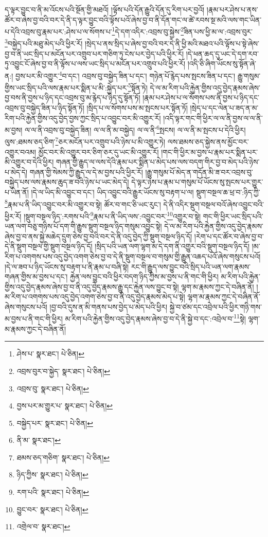 ད་ལྟར་བྱུང་བ་ནི་མ་འོངས་པའི་སྔོན་གྱི་མཐའོ། །ལྟོས་པའི་དོན་རྒྱུའི་དོན་དུ་རིག་པར་བྱའོ། །རྣམ་པར་ཤེས་པ་ནས་ཚོར་བ་ཞེས་བྱ་བའི་བར་དེ་ནི་ད་ལྟར་བྱུང་བའི་ལྟོས་པའོ་ཞེས་བྱ་བ་ནི་དོན་གང་ལ་ཚེ་རབས་སྔ་མའི་ལས་གང་ཡིན་པ་དེའི་འབྲས་བུ་རྣམ་པར་:ཤེས་པ་ལ་སོགས་པ་\footnote{ཤེས་པ་  སྣར་ཐང་།  པེ་ཅིན། }དེ་དག་འདིར་:འབྲས་བུ་སྐྱེས་\footnote{འབྲས་བུར་བ་སྐྱེད་  སྣར་ཐང་།  པེ་ཅིན། }ཟིན་པས་ཕྱི་མ་ལ་:འབྲས་བུར་\footnote{འབྲས་བུ་  སྣར་ཐང་།  པེ་ཅིན། }བསྐྱེད་པའི་མཐུ་མེད་པའི་ཕྱིར་རོ། །སྲེད་པ་ནས་སྲིད་པ་ཞེས་བྱ་བའི་བར་དེ་ནི་ཕྱི་མའི་མཐའ་པའི་ལྟོས་པ་སྟེ་ཞེས་བྱ་བ་ནི་ཡང་སྲིད་པ་མངོན་པར་འགྲུབ་པར་གཅིག་ཏུ་ངེས་པར་བྱེད་པའི་ཕྱིར་རོ། །དེ་ཕན་ཆད་དུ་ཡང་དེ་དག་རབ་ཏུ་འབྱུང་ངོ་ཞེས་བྱ་བ་ནི་ལྟོས་པ་ལས་ཡང་སྲིད་པ་མངོན་པར་འགྲུབ་པའི་ཕྱིར་རོ། །འདི་ཅི་ཞིག་ཡོངས་སུ་སྟོན་ཞེ་ན:། བྱས་པར་མི་འགྱུར་\footnote{བྱས་པར་མ་གྱུར་པ་  སྣར་ཐང་།  པེ་ཅིན། }བ་དང་། འབྲས་བུ་བསྐྱེད་ཟིན་པ་དང་། གཉེན་པོ་རྙེད་པས་སྤངས་ཟིན་པ་དང་། རྒྱུ་གསུམ་གྱིས་ཡང་སྲིད་པའི་ལས་རྣམ་པར་སྨིན་པ་མི་:སྐྱེད་པར་\footnote{བསྐྱེད་པར་  སྣར་ཐང་།  པེ་ཅིན། }སྟོན་ཏེ། དེ་ལ་མ་རིག་པའི་རྐྱེན་གྱིས་འདུ་བྱེད་རྣམས་ཞེས་བྱ་བས་ནི་བྱས་པ་ཉིད་དང་འབྲས་བུ་མ་རྙེད་པ་ཉིད་དུ་སྟོན་ཏོ། །རྣམ་པར་ཤེས་པ་ལ་སོགས་པས་ནི་བྱས་པ་ཉིད་དང་འབྲས་བུ་བསྐྱེད་ཟིན་པ་ཉིད་སྟོན་ཏོ། །སྲིད་པ་ལ་སོགས་པས་མ་སྤངས་པར་སྟོན་ཏོ། །སྲེད་པ་དང་ལེན་པ་ཟད་ན་མ་རིག་པའི་རྐྱེན་གྱིས་འདུ་བྱེད་བྱས་ཀྱང་སྲིད་པ་འབྱུང་བར་མི་འགྱུར་རོ། །འདི་ལྟར་གང་གི་ཕྱིར་ལ་ལ་ནི་བྱས་ལ་ལ་ནི་མ་བྱས། ལ་ལ་ནི་འབྲས་བུ་བསྐྱེད་ཟིན། ལ་ལ་ནི་མ་བསྐྱེད། ལ་ལ་ནི་\footnote{ནི་མ་  སྣར་ཐང་། }སྤངས། ལ་ལ་ནི་མ་སྤངས་པ་དེའི་ཕྱིར། ལུས་:ཐམས་ཅད་ཅིག་\footnote{ཐམས་ཅད་གཅིག་  སྣར་ཐང་།  པེ་ཅིན། }ཅར་མངོན་པར་འགྲུབ་པའི་ཉེས་པ་མི་འགྱུར་ཏེ། ལས་ཐམས་ཅད་སྐྱེས་ནས་མྱོང་བར་འགྱུར་བའམ། མྱོང་བར་མི་འགྱུར་བར་ཅིག་ཅར་དུ་ཡང་མི་འགྱུར་རོ། །གང་གི་ཕྱིར་མ་བྱས་པ་རྣམ་པར་སྨིན་པར་མི་འགྱུར་བ་དེའི་ཕྱིར། གཞན་གྱི་རྒྱུད་ལ་ལས་དེའི་རྣམ་པར་སྨིན་པ་མེད་པས་ལས་བདག་གིར་བྱ་བ་མེད་པའི་ཉེས་པ་མེད་དེ། གཞན་གྱི་སེམས་ཀྱི་རྒྱུད་ལ་དེ་མ་བྱས་པའི་ཕྱིར་རོ། །རྒྱུ་གསུམ་པོ་མེད་ན་གདོན་མི་ཟ་བར་འབྲས་བུ་བསྐྱེད་པས་ལས་རྣམས་ཆུད་ཟ་བའི་ཉེས་པ་ཡང་མེད་དེ། དེ་ལྟར་ཉེས་པ་རྣམ་པ་གསུམ་པོ་ཡོངས་སུ་སྤངས་པར་གྱུར་པ་ཡིན་ནོ། །དེ་ལ་ཡིད་མི་འབྱུང་བ་དང་། ཡིད་འབྱུང་བའི་རྒྱུར་ཡོངས་སུ་བརྟག་པ་ལ། སྡུག་བསྔལ་ཆ་ཕྲ་བ་:ཉིད་ཀྱི་\footnote{ཉིད་ཀྱིས་  སྣར་ཐང་།  པེ་ཅིན། }རྣམ་པ་ནི་ཡིད་འབྱུང་བར་མི་འགྱུར་བ་སྟེ། ཚོར་བ་གང་ཅི་ཡང་རུང་། དེ་ནི་འདིར་སྡུག་བསྔལ་བའོ་ཞེས་འབྱུང་བའི་ཕྱིར་རོ། །སྡུག་བསྔལ་ཉིད་:རགས་པའི་\footnote{རག་པའི་  སྣར་ཐང་།  པེ་ཅིན། }རྣམ་པ་ནི་ཡིད་ལས་:འབྱུང་བར་\footnote{བྱུང་བར་  སྣར་ཐང་།  པེ་ཅིན། }འགྱུར་བ་སྟེ། གང་གི་ཕྱིར་ཡང་སྲིད་པའི་ཡན་ལག་བཅུ་གཉིས་པོ་དག་གི་རྒྱུས་སྡུག་བསྔལ་ཉིད་གསུམ་འབྱུང་སྟེ། དེ་ལ་མ་རིག་པའི་རྐྱེན་གྱིས་འདུ་བྱེད་རྣམས་ཞེས་བྱ་བ་ནས་སྐྱེ་མཆེད་དྲུག་ཅེས་བྱ་བའི་བར་དེ་ནི་འདུ་བྱེད་ཀྱི་སྡུག་བསྔལ་ཉིད་དོ། །རེག་པ་དང་ཚོར་བ་ཞེས་བྱ་བ་དེ་ནི་སྡུག་བསྔལ་གྱི་སྡུག་བསྔལ་ཉིད་དོ། །སྲིད་པའི་ཡན་ལག་ལྷག་མ་དེ་དག་ནི་འགྱུར་བའི་སྡུག་བསྔལ་ཉིད་དོ། །མ་རིག་པ་འགགས་པས་འདུ་བྱེད་འགག་ཅེས་བྱ་བ་དེ་ནི་སྡུག་བསྔལ་བ་གསུམ་གྱི་རྒྱུན་འཆད་པའོ་ཞེས་གསུངས་པའོ། །དེ་ལ་ཟབ་པ་ཉིད་ཡོངས་སུ་བརྟག་པ་ནི་རྣམ་པ་བཞི་སྟེ། རང་གི་རྒྱུད་ལས་བྱུང་བའི་སྲིད་པའི་ཡན་ལག་རྣམས་གཞན་གྱིས་མ་བྱས་པ་དང་། རྐྱེན་ལས་བྱུང་བའི་ཕྱིར་བདག་ཉིད་ཀྱིས་མ་བྱས་པ་ནི་གང་གི་ཕྱིར། མ་རིག་པའི་རྐྱེན་གྱིས་འདུ་བྱེད་རྣམས་ཞེས་བྱ་བ་ནི་འདུ་བྱེད་རྣམས་རྒྱུ་དང་རྐྱེན་ལས་བྱུང་བ་སྟེ། ལྷག་མ་རྣམས་ཀྱང་དེ་བཞིན་ནོ། །མ་རིག་པ་འགགས་པས་འདུ་བྱེད་འགག་ཅེས་བྱ་བ་ནི་འདུ་བྱེད་རྣམས་མེད་པ་སྟེ། ལྷག་མ་རྣམས་ཀྱང་དེ་བཞིན་ནོ་ཞེས་གསུངས་པའོ། །བྱ་བའི་དུས་ན་མི་གནས་པས་བྱེད་པ་མེད་པའི་ཕྱིར། སྐྱེ་བ་ཙམ་དང་འབྲེལ་པའི་ཕྱིར་གཉི་གས་མ་བྱས་པ་ནི་གང་གི་ཕྱིར། མ་རིག་པའི་རྐྱེན་གྱིས་འདུ་བྱེད་རྣམས་ཞེས་བྱ་བ་དེ་ནི་སྐྱེ་བ་དང་:འབྲེལ་བ་\footnote{འགྲེལ་བ་  སྣར་ཐང་། }སྟེ། ལྷག་མ་རྣམས་ཀྱང་དེ་བཞིན་ནོ། 